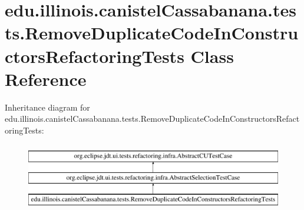 \hypertarget{classedu_1_1illinois_1_1canistelCassabanana_1_1tests_1_1RemoveDuplicateCodeInConstructorsRefactoringTests}{
\section{edu.illinois.canistelCassabanana.tests.RemoveDuplicateCodeInConstructorsRefactoringTests Class Reference}
\label{classedu_1_1illinois_1_1canistelCassabanana_1_1tests_1_1RemoveDuplicateCodeInConstructorsRefactoringTests}
}
Inheritance diagram for edu.illinois.canistelCassabanana.tests.RemoveDuplicateCodeInConstructorsRefactoringTests:\begin{figure}[H]
\begin{center}
\leavevmode
\includegraphics[height=3.000000cm]{classedu_1_1illinois_1_1canistelCassabanana_1_1tests_1_1RemoveDuplicateCodeInConstructorsRefactoringTests}
\end{center}
\end{figure}
